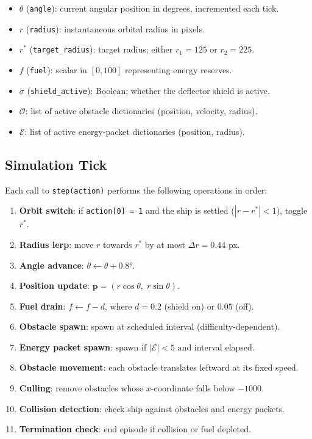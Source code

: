 \documentclass[12pt]{article}
\begin{document}
\begin{itemize}
    \item $\theta$ (\texttt{angle}): current angular position in degrees, incremented each tick.
    \item $r$ (\texttt{radius}): instantaneous orbital radius in pixels.
    \item $r^*$ (\texttt{target\_radius}): target radius; either $r_1 = 125$ or $r_2 = 225$.
    \item $f$ (\texttt{fuel}): scalar in $[0, 100]$ representing energy reserves.
    \item $\sigma$ (\texttt{shield\_active}): Boolean; whether the deflector shield is active.
    \item $\mathcal{O}$: list of active obstacle dictionaries (position, velocity, radius).
    \item $\mathcal{E}$: list of active energy-packet dictionaries (position, radius).
\end{itemize}

\subsection{Simulation Tick}

Each call to \texttt{step(action)} performs the following operations in order:

\begin{enumerate}
    \item \textbf{Orbit switch}: if \texttt{action[0] = 1} and the ship is settled ($|r - r^*| < 1$), toggle $r^*$.
    \item \textbf{Radius lerp}: move $r$ towards $r^*$ by at most $\Delta r = 0.44$ px.
    \item \textbf{Angle advance}: $\theta \leftarrow \theta + 0.8°$.
    \item \textbf{Position update}: $\mathbf{p} = (r\cos\theta,\; r\sin\theta)$.
    \item \textbf{Fuel drain}: $f \leftarrow f - d$, where $d = 0.2$ (shield on) or $0.05$ (off).
    \item \textbf{Obstacle spawn}: spawn at scheduled interval (difficulty-dependent).
    \item \textbf{Energy packet spawn}: spawn if $|\mathcal{E}| < 5$ and interval elapsed.
    \item \textbf{Obstacle movement}: each obstacle translates leftward at its fixed speed.
    \item \textbf{Culling}: remove obstacles whose $x$-coordinate falls below $-1000$.
    \item \textbf{Collision detection}: check ship against obstacles and energy packets.
    \item \textbf{Termination check}: end episode if collision or fuel depleted.
\end{enumerate}
\end{document}
